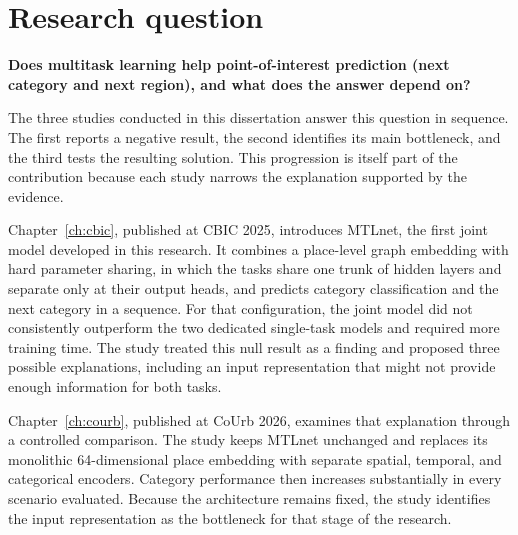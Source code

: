 \section{Research question}
\label{sec:intro:arc}

\textbf{Does multitask learning help point-of-interest prediction (next category and
next region), and what does the answer depend on?}

The three studies conducted in this dissertation answer this question in sequence. The first reports a negative
result, the second identifies its main bottleneck, and the third tests the resulting
solution. This progression is itself part of the contribution because each study
narrows the explanation supported by the evidence.

Chapter~\ref{ch:cbic}, published at CBIC 2025, introduces MTLnet, the first joint model
developed in this research. It combines a place-level graph embedding with hard
parameter sharing, in which the tasks share one trunk of hidden layers and separate
only at their output heads, and predicts category classification and the next category
in a sequence. For that configuration, the joint model did not consistently outperform
the two dedicated single-task models and required more training time. The study
treated this null result as a finding and proposed three possible explanations,
including an input representation that might not provide enough information for both
tasks.

Chapter~\ref{ch:courb}, published at CoUrb 2026, examines that explanation through a
controlled comparison. The study keeps MTLnet unchanged and replaces its monolithic
64-dimensional place embedding with separate spatial, temporal, and categorical
encoders. Category performance then increases substantially in every scenario evaluated.
Because the architecture remains fixed, the study identifies the input representation
as the bottleneck for that stage of the research.

